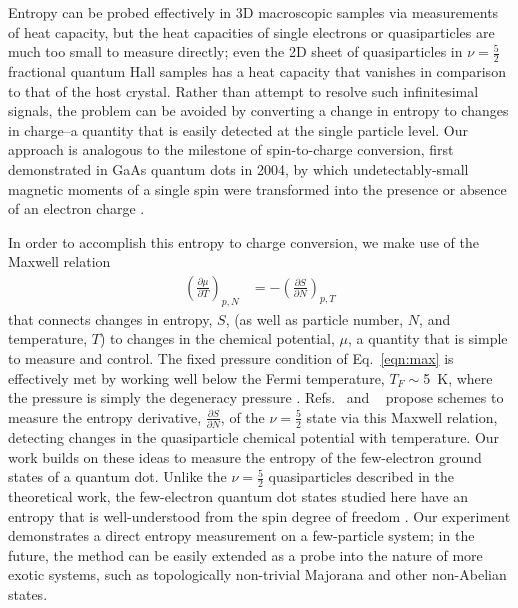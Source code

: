 \documentclass[preprint,showpacs,preprintnumbers,amsmath,amssymb,pra,aps,superscriptaddress]{revtex4-1}
\begin{document}
Entropy can be probed effectively in 3D macroscopic samples via measurements of heat capacity, but the heat capacities of single electrons or quasiparticles are much too small to measure directly; even the 2D sheet of quasiparticles in $\nu = \frac{5}{2}$ fractional quantum Hall samples has a heat capacity that vanishes in comparison to that of the host crystal.  Rather than attempt to resolve such infinitesimal signals, the problem can be avoided by converting a change in entropy to changes in charge--a quantity that is easily detected at the single particle level.  Our approach is analogous to the milestone of spin-to-charge conversion, first demonstrated in GaAs quantum dots in 2004, by which undetectably-small magnetic moments of a single spin were transformed into the presence or absence of an electron charge \cite{Elzerman2004, Ono2004}.

In order to accomplish this entropy to charge conversion, we make use of the Maxwell relation
%
\begin{align}
\label{eqn:max}
        \left(\frac{\partial \mu}{\partial T}\right)_{p,N} &= -\left(\frac{\partial S}{\partial N}\right)_{p,T}
\end{align}
%
that connects changes in entropy, $S$, (as well as particle number, $N$, and temperature, $T$) to changes in the chemical potential, $\mu$, a quantity that is simple to measure and control. The fixed pressure condition of Eq.~\ref{eqn:max} is effectively met by working well below the Fermi temperature, $T_F \sim$\SI{5}{\kelvin}, where the pressure is simply the degeneracy pressure \cite{Landau1969}. Refs.~ and ~ propose schemes to measure the entropy derivative, $\frac{\partial S}{\partial N}$, of the $\nu = \frac{5}{2}$ state via this Maxwell relation, detecting changes in the quasiparticle chemical potential with temperature.  Our work builds on these ideas to measure the entropy of the few-electron ground states of a quantum dot. Unlike the $\nu = \frac{5}{2}$ quasiparticles described in the theoretical work, the few-electron quantum dot states studied here have an entropy that is well-understood from the spin degree of freedom \cite{Tarucha1996, Ciorga2000, Duncan2000, Lindemann2002, Potok2003, Hofmann2016}. Our experiment demonstrates a direct entropy measurement on a few-particle system; in the future, the method can be easily extended as a probe into the nature of more exotic systems, such as topologically non-trivial Majorana and other non-Abelian states.
\end{document}
